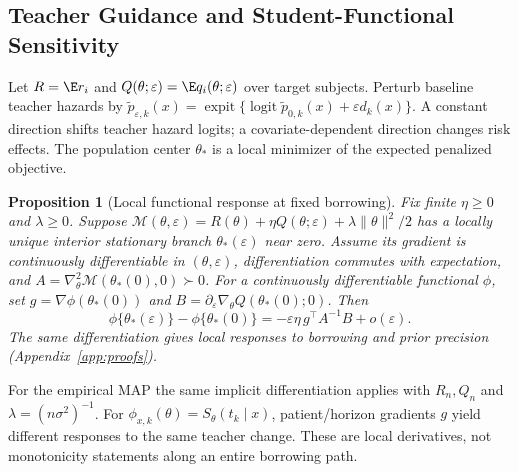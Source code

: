\documentclass{article} %
\newtheorem{proposition}{Proposition}
\DeclareMathOperator{\expit}{expit}
\DeclareMathOperator{\logit}{logit}
\begin{document}
\subsection{Teacher Guidance and Student-Functional Sensitivity}
\label{sec:target-centered-main}
Let $R=\E r_i$ and $Q(\theta;\varepsilon)=\E q_i(\theta;\varepsilon)$ over target subjects. Perturb baseline teacher hazards by $\widetilde p_{\varepsilon,k}(x)=\expit\{\logit\widetilde p_{0,k}(x)+\varepsilon d_k(x)\}$.
A constant direction shifts teacher hazard logits; a covariate-dependent direction changes risk effects. The population center $\theta_*$ is a local minimizer of the expected penalized objective.

\begin{proposition}[Local functional response at fixed borrowing]
\label{prop:functional-sensitivity}
Fix finite $\eta\ge0$ and $\lambda\ge0$. Suppose
$\mathcal M(\theta,\varepsilon)=R(\theta)+\eta Q(\theta;\varepsilon)+\lambda\|\theta\|^2/2$
has a locally unique interior stationary branch $\theta_*(\varepsilon)$ near zero. Assume its gradient is continuously differentiable in $(\theta,\varepsilon)$, differentiation commutes with expectation, and $A=\nabla_\theta^2\mathcal M(\theta_*(0),0)\succ0$. For a continuously differentiable functional $\phi$, set
$g=\nabla\phi(\theta_*(0))$ and
$B=\partial_\varepsilon\nabla_\theta Q(\theta_*(0);0)$. Then
\begin{equation}
\phi\{\theta_*(\varepsilon)\}-\phi\{\theta_*(0)\}
=-\varepsilon\eta\,g^\top A^{-1}B+o(\varepsilon).
\label{eq:functional-sensitivity}
\end{equation}
The same differentiation gives local responses to borrowing and prior precision (Appendix~\ref{app:proofs}).
\end{proposition}
For the empirical MAP the same implicit differentiation applies with $R_n,Q_n$ and $\lambda=(n\sigma^2)^{-1}$. For $\phi_{x,k}(\theta)=S_\theta(t_k\mid x)$, patient/horizon gradients $g$ yield different responses to the same teacher change. These are local derivatives, not monotonicity statements along an entire borrowing path.
\end{document}
